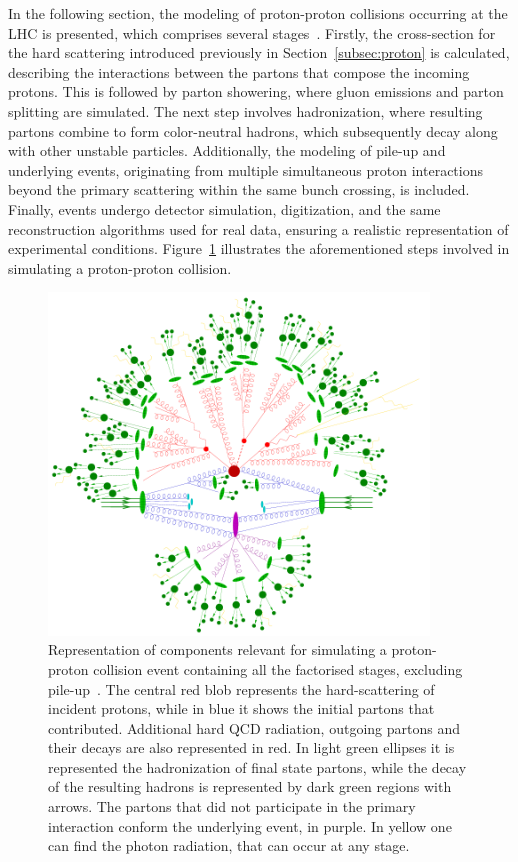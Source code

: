 In the following section, the modeling of proton-proton collisions occurring at the LHC is presented, which comprises several stages~\cite{BUCKLEY2011145}.
Firstly, the cross-section for the hard scattering introduced previously in Section~\ref{subsec:proton} is calculated, describing the interactions between the partons that compose the incoming protons.
This is followed by parton showering, where gluon emissions and parton splitting are simulated. The next step involves hadronization, where resulting partons combine to form color-neutral hadrons, which subsequently decay along with other unstable particles. Additionally, the modeling of pile-up and underlying events, originating from multiple simultaneous proton interactions beyond the primary scattering within the same bunch crossing, is included.
Finally, events undergo detector simulation, digitization, and the same reconstruction algorithms used for real data, ensuring a realistic representation of experimental conditions.
Figure~\ref{fig:pdfs} illustrates the aforementioned steps involved in simulating a proton-proton collision.
\begin{figure}[htbp]
    \centering
    \includegraphics[width=0.9\textwidth]{images/atlas_pp_sim.png}
    \caption{Representation of components relevant for simulating a proton-proton collision event containing all the factorised stages, excluding pile-up~\cite{Gleisberg_2009}. The central red blob represents the hard-scattering of incident protons,
    while in blue it shows the initial partons that contributed. Additional hard QCD radiation, outgoing partons and their decays are also represented in red. In light green ellipses it is represented the hadronization of final state partons, while the decay
    of the resulting hadrons is represented by dark green regions with arrows. The partons that did not participate in the primary interaction conform the underlying event, in purple. In yellow one can find the photon radiation, that can occur at any stage.}
    \label{fig:pdfs}
  \end{figure}

